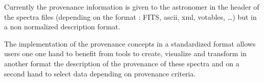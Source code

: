 Currently the provenance information is given to the astronomer in the header of the spectra files (depending on the format : FITS, ascii, xml, votables, …) but in a non normalized description format. 

The implementation of the provenance concepts in a standardized format allows users one one hand to benefit from tools to create, visualize and transform in another format the description of the provenance of these spectra and on a second hand to select data depending on provenance criteria.

 
